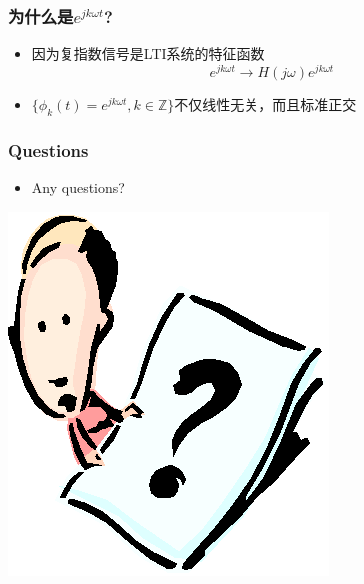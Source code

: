 \documentclass[CJKutf8,xcolor=pdftex,dvipsnames,table]{beamer}
\begin{document}
\begin{CJK*}{UTF8}{song}
  \begin{frame}
    \frametitle{为什么是$e^{jk\omega t}$?}
    \begin{itemize}
    \item 因为复指数信号是LTI系统的特征函数
    \[ e^{jk\omega t} \rightarrow H(j\omega)e^{jk\omega t} \]
    \item $\{\phi_k(t)=e^{jk\omega t}, k \in \mathbb{Z}\}$不仅线性无关，而且标准正交
    \end{itemize}
  \end{frame}  
    
  \begin{frame}
    \frametitle{Questions}
    \begin{itemize}
    \item Any questions?
    \end{itemize}
    \begin{center}
      \includegraphics[scale=.5]{question}
    \end{center}
  \end{frame}   
          
\end{CJK*}
\end{document}
